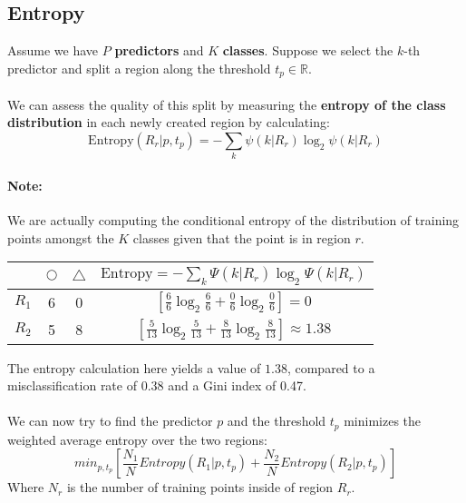 \documentclass[11pt,a4paper]{report}
\begin{document}
\subsection{Entropy}
Assume we have $P$ \textbf{predictors} and $K$ \textbf{classes}. Suppose we select the $k$-th predictor and split a region along the threshold $t_p\in\mathbb{R}$.\\\\
We can assess the quality of this split by measuring the \textbf{entropy of the class distribution} in each newly created region by calculating:
$$\textrm{Entropy}(R_r|p,	t_p) = - \sum_k\psi(k|R_r)\log_2\psi(k|R_r)$$
\begin{framed}
\paragraph{Note:} We are actually computing the conditional entropy of the distribution of training points amongst the $K$ classes given that the point is in region $r$.
\end{framed}
\begin{center}
\begin{tabular}{ |c|c|c|c| } 
 \hline
  & $\bigcirc$ & $\triangle$ & $\textrm{Entropy}= - \sum_k\Psi(k|R_r)\log_2\Psi(k|R_r)$\\\hline\hline
 $R_1$ & 6 & 0 & $\left[\frac{6}{6}\log_2\frac{6}{6}+\frac{0}{6}\log_2\frac{0}{6}\right] = 0$\\\hline
 $R_2$ & 5 & 8 & $\left[\frac{5}{13}\log_2\frac{5}{13}+\frac{8}{13}\log_2\frac{8}{13}\right] \approx 1.38$\\\hline
\end{tabular}
\end{center}
The entropy calculation here yields a value of $1.38$, compared to a misclassification rate of 0.38 and a Gini index of 0.47.\\\\
We can now try to find the predictor $p$ and the threshold $t_p$ minimizes the weighted average entropy over the two regions:
$$min_{p,t_p}\left[\frac{N_1}{N}Entropy(R_1|p,t_p)+\frac{N_2}{N}Entropy(R_2|p,t_p)\right]$$
Where $N_r$ is the number of training points inside of region $R_r$.
\end{document}
